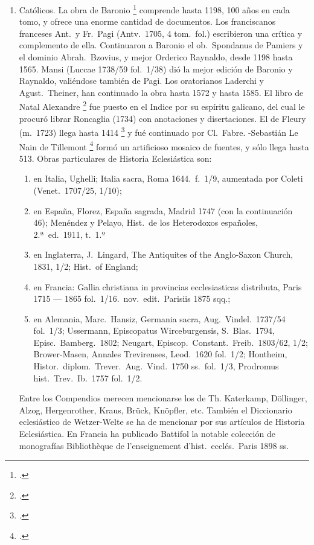 \raggedbottom{} \documentclass[12pt, a4paper, openany]{book} %
\begin{document}
\begin{enumerate}
  \item Católicos. La obra de Baronio \footcite{Baronio1588Annales} comprende hasta 1198, 100 años en cada tomo, y ofrece una enorme cantidad de documentos. Los franciscanos franceses Ant.\ y Fr.\ Pagi (Antv.\ 1705, 4 tom.\ fol.) escribieron una crítica y complemento de ella. Continuaron a Baronio el ob.\ Spondanus de Pamiers y el dominio Abrah.\ Bzovius, y mejor Orderico Raynaldo, desde 1198 hasta 1565. Mansi (Luccae 1738/59 fol.\ 1/38) dió la mejor edición de Baronio y Raynaldo, valiéndose también de Pagi. Los oratorianos Laderchi y Agust.\ Theiner, han continuado la obra hasta 1572 y hasta 1585. El libro de Natal Alexandre \footcite{Natal1676Selecta} fue puesto en el Indice por su espíritu galicano, del cual le procuró librar Roncaglia (1734) con anotaciones y disertaciones. El de Fleury (m.\ 1723) llega hasta 1414 \footcite{FleuryFabre1691Histoire} y fué continuado por Cl.\ Fabre. -Sebastián Le Nain de Tillemont \footcite{Tillemont1693Mem} formó un artificioso mosaico de fuentes, y sólo llega hasta 513. Obras particulares de Historia Eclesiástica son:\begin{enumerate}
          \item en Italia, Ughelli; Italia sacra, Roma 1644.\ f.\ 1/9, aumentada por Coleti (Venet.\ 1707/25, 1/10);
          \item en España, Florez, España sagrada, Madrid 1747 (con la continuación 46); Menéndez y Pelayo, Hist.\ de los Heterodoxos españoles, 2.ª\ ed.\ 1911, t.\ 1.º\
          \item en Inglaterra, J.\ Lingard, The Antiquites of the Anglo-Saxon Church, 1831, 1/2; Hist.\ of England;
          \item en Francia: Gallia christiana in provincias ecclesiasticas distributa, Paris 1715 --- 1865 fol.\ 1/16.\ nov.\ edit.\ Parisiis 1875 sqq.;
          \item en Alemania, Marc.\ Hansiz, Germania sacra, Aug.\ Vindel.\ 1737/54 fol.\ 1/3; Ussermann, Episcopatus Wirceburgensis, S.\ Blas.\ 1794, Episc.\ Bamberg.\ 1802; Neugart, Episcop.\ Constant.\ Freib.\ 1803/62, 1/2; Brower-Masen, Annales Trevirenses, Leod.\ 1620 fol.\ 1/2; Hontheim, Histor.\ diplom.\ Trever.\ Aug.\ Vind.\ 1750 ss.\ fol.\ 1/3, Prodromus hist.\ Trev.\ Ib.\ 1757 fol.\ 1/2.
        \end{enumerate}
        Entre los Compendios merecen mencionarse los de Th. Katerkamp, Döllinger, Alzog, Hergenrother, Kraus, Brück, Knöpfler, etc. También el Diccionario eclesiástico de Wetzer-Welte se ha de mencionar por sus artículos de Historia Eclesiástica. En Francia ha publicado Battifol la notable colección de monografías Bibliothèque de l'enseignement d'hist.\ ecclés.\ Paris 1898 ss.

\end{enumerate}
\end{document}

